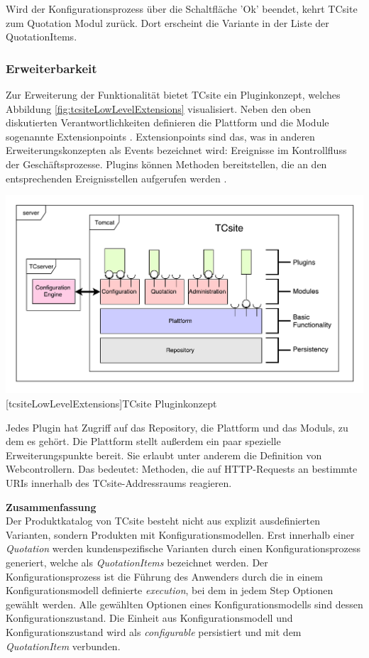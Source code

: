 \documentclass[12pt,a4paper,bibliography=totocnumbered,listof=totoc]{scrartcl}
\begin{document}
Wird der Konfigurationsprozess über die Schaltfläche 'Ok' beendet, kehrt TCsite zum Quotation Modul zurück. Dort erscheint die Variante in der Liste der QuotationItems.

\subsubsection{Erweiterbarkeit}
\label{subsubsection:Erweiterbarkeit}

Zur Erweiterung der Funktionalität bietet TCsite ein Pluginkonzept, welches Abbildung \ref{fig:tcsiteLowLevelExtensions} visualisiert. Neben den oben diskutierten Verantwortlichkeiten definieren die Plattform und die Module sogenannte Extensionpoints \citep{tactonTCsiteApiDocu}. Extensionpoints sind das, was in anderen Erweiterungskonzepten als Events bezeichnet wird: Ereignisse im Kontrollfluss der Geschäftsprozesse. Plugins können Methoden bereitstellen, die an den entsprechenden Ereignisstellen aufgerufen werden  \citep{tactonTCsiteDevelopmentManual}.

\vspace{1em}
\begin{minipage}{\linewidth}
	\centering
	\includegraphics[width=0.8\linewidth]{Abbildungen/tcsiteLowLevelExtensions.pdf}
	[tcsiteLowLevelExtensions]{TCsite Pluginkonzept}
	\label{fig:tcsiteLowLevelExtensions}
\end{minipage}
\vspace{1em}

Jedes Plugin hat Zugriff auf das Repository, die Plattform und das Moduls, zu dem es gehört. Die Plattform stellt außerdem ein paar spezielle Erweiterungspunkte bereit. Sie erlaubt unter anderem die Definition von Webcontrollern. Das bedeutet: Methoden, die auf HTTP-Requests an bestimmte URIs innerhalb des TCsite-Addressraums reagieren.

\textbf{Zusammenfassung}\\
Der Produktkatalog von TCsite besteht nicht aus explizit ausdefinierten Varianten, sondern Produkten mit Konfigurationsmodellen. Erst innerhalb einer \emph{Quotation} werden kundenspezifische Varianten durch einen Konfigurationsprozess generiert, welche als \emph{QuotationItems} bezeichnet werden. Der Konfigurationsprozess ist die Führung des Anwenders durch die in einem Konfigurationsmodell definierte \emph{execution}, bei dem in jedem Step Optionen gewählt werden. Alle gewählten Optionen eines Konfigurationsmodells sind dessen Konfigurationszustand. Die Einheit aus Konfigurationsmodell und Konfigurationszustand wird als \emph{configurable} persistiert und mit dem \emph{QuotationItem} verbunden.
\end{document}
